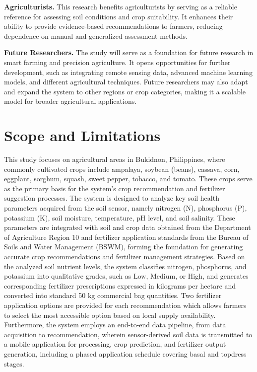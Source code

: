 {	\textbf{Agriculturists.}
	This research benefits agriculturists by serving as a reliable reference for assessing soil conditions and crop suitability. It enhances their ability to provide evidence-based recommendations to farmers, reducing dependence on manual and generalized assessment methods.
	
	\textbf{Future Researchers.}
	The study will serve as a foundation for future research in smart farming and precision agriculture. It opens opportunities for further development, such as integrating remote sensing data, advanced machine learning models, and different agricultural techniques. Future researchers may also adapt and expand the system to other regions or crop categories, making it a scalable model for broader agricultural applications.
	
	\section{Scope and Limitations}
	
	This study focuses on agricultural areas in Bukidnon, Philippines, where commonly cultivated crops include ampalaya, soybean (beans), cassava, corn, eggplant, sorghum, squash, sweet pepper, tobacco, and tomato. These crops serve as the primary basis for the system's crop recommendation and fertilizer suggestion processes. The system is designed to analyze key soil health parameters acquired from the soil sensor, namely nitrogen (N), phosphorus (P), potassium (K), soil moisture, temperature, pH level, and soil salinity. These parameters are integrated with soil and crop data obtained from the Department of Agriculture Region 10 and fertilizer application standards from the Bureau of Soils and Water Management (BSWM), forming the foundation for generating accurate crop recommendations and fertilizer management strategies. Based on the analyzed soil nutrient levels, the system classifies nitrogen, phosphorus, and potassium into qualitative grades, such as Low, Medium, or High, and generates corresponding fertilizer prescriptions expressed in kilograms per hectare and converted into standard 50 kg commercial bag quantities. Two fertilizer application options are provided for each recommendation which allows farmers to select the most accessible option based on local supply availability. Furthermore, the system employs an end-to-end data pipeline, from data acquisition to recommendation, wherein sensor-derived soil data is transmitted to a mobile application for processing, crop prediction, and fertilizer output generation, including a phased application schedule covering basal and topdress stages.
	
}
